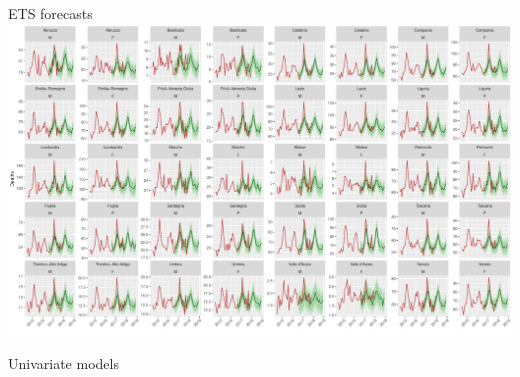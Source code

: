 \documentclass[12pt,aspectratio=169]{beamer}
\begin{document}
\begin{frame}{ETS forecasts}
    \centering%
    \includegraphics[height=0.9\textheight]{figures/forecasts_ets}
\end{frame}

\begin{frame}{Univariate models}
    \centering%
\end{frame}
\end{document}
